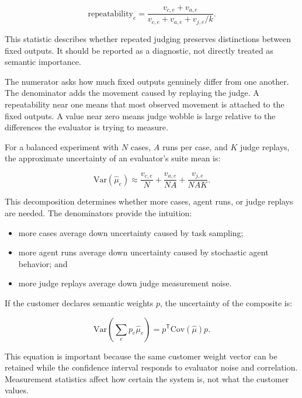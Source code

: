 \documentclass[11pt]{article}
\begin{document}
\begin{equation}
\mathrm{repeatability}_e
=
\frac{v_{c,e} + v_{a,e}}
     {v_{c,e} + v_{a,e} + v_{j,e}/k}.
\end{equation}

This statistic describes whether repeated judging preserves distinctions
between fixed outputs. It should be reported as a diagnostic, not directly
treated as semantic importance.

The numerator asks how much fixed outputs genuinely differ from one another.
The denominator adds the movement caused by replaying the judge. A
repeatability near one means that most observed movement is attached to the
fixed outputs. A value near zero means judge wobble is large relative to the
differences the evaluator is trying to measure.

For a balanced experiment with \(N\) cases, \(A\) runs per case, and \(K\)
judge replays, the approximate uncertainty of an evaluator's suite mean is:

\begin{equation}
\mathrm{Var}(\widehat{\mu}_e)
\approx
\frac{v_{c,e}}{N}
+ \frac{v_{a,e}}{NA}
+ \frac{v_{j,e}}{NAK}.
\end{equation}

This decomposition determines whether more cases, agent runs, or judge
replays are needed. The denominators provide the intuition:

\begin{itemize}
    \item more cases average down uncertainty caused by task sampling;
    \item more agent runs average down uncertainty caused by stochastic agent
    behavior; and
    \item more judge replays average down judge measurement noise.
\end{itemize}

If the customer declares semantic weights \(p\), the uncertainty of the
composite is:

\begin{equation}
\mathrm{Var}
\left(
\sum_e p_e \widehat{\mu}_e
\right)
=
p^{\mathsf{T}}
\mathrm{Cov}(\widehat{\mu})
p.
\end{equation}

This equation is important because the same customer weight vector can be
retained while the confidence interval responds to evaluator noise and
correlation. Measurement statistics affect how certain the system is, not what
the customer values.
\end{document}
